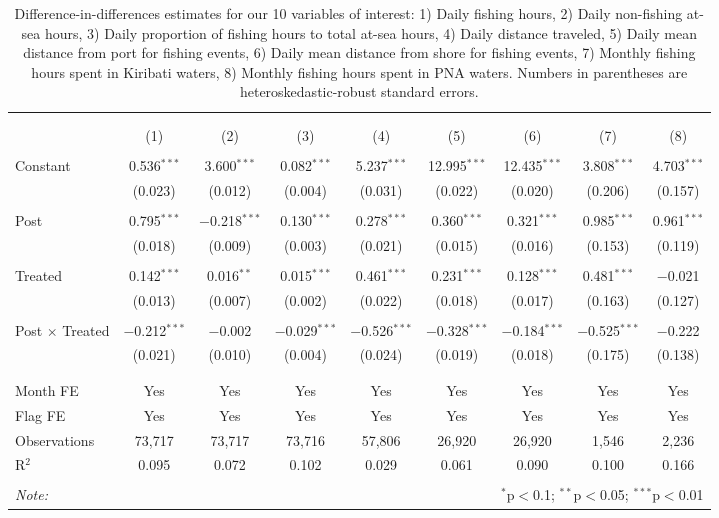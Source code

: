 
\begin{table}[!htbp] \centering 
  \caption{\label{tab:DID_without_USA_TWN}Difference-in-differences estimates for our 10 variables of interest: 1) Daily fishing hours, 2) Daily non-fishing at-sea hours, 3) Daily proportion of fishing hours to total at-sea hours, 4) Daily distance traveled, 5) Daily mean distance from port for fishing events, 6) Daily mean distance from shore for fishing events, 7) Monthly fishing hours spent in Kiribati waters, 8) Monthly fishing hours spent in PNA waters. Numbers in parentheses are heteroskedastic-robust standard errors.} 
  \label{} 
\footnotesize 
\begin{tabular}{@{\extracolsep{1pt}}lcccccccc} 
\\[-1.8ex]\hline 
\hline \\[-1.8ex] 
\\[-1.8ex] & (1) & (2) & (3) & (4) & (5) & (6) & (7) & (8)\\ 
\hline \\[-1.8ex] 
 Constant & 0.536$^{***}$ & 3.600$^{***}$ & 0.082$^{***}$ & 5.237$^{***}$ & 12.995$^{***}$ & 12.435$^{***}$ & 3.808$^{***}$ & 4.703$^{***}$ \\ 
  & (0.023) & (0.012) & (0.004) & (0.031) & (0.022) & (0.020) & (0.206) & (0.157) \\ 
  & & & & & & & & \\ 
 Post & 0.795$^{***}$ & $-$0.218$^{***}$ & 0.130$^{***}$ & 0.278$^{***}$ & 0.360$^{***}$ & 0.321$^{***}$ & 0.985$^{***}$ & 0.961$^{***}$ \\ 
  & (0.018) & (0.009) & (0.003) & (0.021) & (0.015) & (0.016) & (0.153) & (0.119) \\ 
  & & & & & & & & \\ 
 Treated & 0.142$^{***}$ & 0.016$^{**}$ & 0.015$^{***}$ & 0.461$^{***}$ & 0.231$^{***}$ & 0.128$^{***}$ & 0.481$^{***}$ & $-$0.021 \\ 
  & (0.013) & (0.007) & (0.002) & (0.022) & (0.018) & (0.017) & (0.163) & (0.127) \\ 
  & & & & & & & & \\ 
 Post $\times$ Treated & $-$0.212$^{***}$ & $-$0.002 & $-$0.029$^{***}$ & $-$0.526$^{***}$ & $-$0.328$^{***}$ & $-$0.184$^{***}$ & $-$0.525$^{***}$ & $-$0.222 \\ 
  & (0.021) & (0.010) & (0.004) & (0.024) & (0.019) & (0.018) & (0.175) & (0.138) \\ 
  & & & & & & & & \\ 
\hline \\[-1.8ex] 
Month FE & Yes & Yes & Yes & Yes & Yes & Yes & Yes & Yes \\ 
Flag FE & Yes & Yes & Yes & Yes & Yes & Yes & Yes & Yes \\ 
Observations & 73,717 & 73,717 & 73,716 & 57,806 & 26,920 & 26,920 & 1,546 & 2,236 \\ 
R$^{2}$ & 0.095 & 0.072 & 0.102 & 0.029 & 0.061 & 0.090 & 0.100 & 0.166 \\ 
\hline 
\hline \\[-1.8ex] 
\textit{Note:}  & \multicolumn{8}{r}{$^{*}$p$<$0.1; $^{**}$p$<$0.05; $^{***}$p$<$0.01} \\ 
\end{tabular} 
\end{table} 
